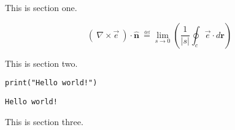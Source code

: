 This is section one.

\cite{Cory_1925}

\begin{equation}
(~\nabla \times \vec{e}~) \cdot \mathbf{\hat{n}} \
        \overset{\underset{\mathrm{def}}{}}{=}
    \lim_{s \to 0}\left( \frac{1}{|s|}\oint_{c} \vec{e} \cdot d\mathbf{r}\right)
\end{equation}

This is section two.

\begin{verbatim}
print("Hello world!")
\end{verbatim}

\begin{verbatim}
Hello world!
\end{verbatim}

This is section three.